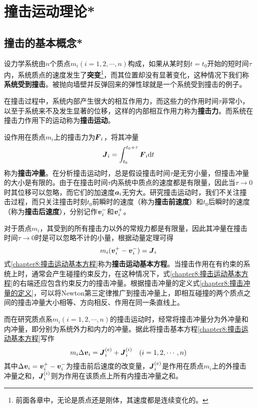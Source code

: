\chapter{撞击运动理论*}

\section{撞击的基本概念*}

设力学系统由$n$个质点$m_i(i=1,2,\cdots,n)$构成，如果从某时刻$t=t_0$开始的短时间$\tau$内，系统质点的速度发生了{\bf 突变}\footnote{前面各章中，无论是质点还是刚体，其速度都是连续变化的。}，而其位置却没有显著变化，这种情况下我们称{\bf 系统受到撞击}。被抛向墙壁并反弹回来的弹性球就是一个系统受到撞击的例子。

在撞击过程中，系统内部产生很大的相互作用力，而这些力的作用时间$\tau$非常小，以至于系统来不及发生显著的位移，这样的内部相互作用力称为{\bf 撞击力}。而系统在撞击力作用下的运动称为{\bf 撞击运动}。

设作用在质点$m_i$上的撞击力为$\boldsymbol{F}_i$，将其冲量
\begin{equation}
	\boldsymbol{J}_i = \int_{t_0}^{t_0+\tau}\boldsymbol{F}_i\mathrm{d} t
	\label{chapter8:撞击冲量的定义}
\end{equation}
称为{\bf 撞击冲量}。在分析撞击运动时，总是假设撞击时间$\tau$是无穷小量，但撞击冲量的大小是有限的。由于在撞击时间$\tau$内系统中质点的速度都是有限量，因此当$\tau\to0$时其位移可以忽略，而它们的加速度$\boldsymbol{a}_i$无穷大。研究撞击运动时，我们不关注撞击过程，而只关注撞击时刻$t_0$前瞬时的速度（称为{\bf 撞击前速度}）和$t_0$后瞬时的速度（称为{\bf 撞击后速度}），分别记作$\boldsymbol{v}_i^-$和$\boldsymbol{v}_i^+$。

对于质点$m_i$，其受到的所有撞击力以外的常规力都是有限量，因此其冲量在撞击时间$\tau\to 0$时是可以忽略不计的小量，根据动量定理可得
\begin{equation}
	m_i(\boldsymbol{v}_i^+-\boldsymbol{v}_i^-) = \boldsymbol{J}_i
	\label{chapter8:撞击运动基本方程}
\end{equation}
式\eqref{chapter8:撞击运动基本方程}称为{\bf 撞击运动基本方程}。当撞击作用在有约束的系统上时，通常会产生碰撞约束反力，在这种情况下，式\eqref{chapter8:撞击运动基本方程}的右端还应包含约束反力的撞击冲量。根据撞击冲量的定义式\eqref{chapter8:撞击冲量的定义}，可以将Newton第三定律推广到撞击冲量上，即相互碰撞的两个质点之间的撞击冲量大小相等、方向相反、作用在同一条直线上。

而在研究质点系$m_i(i=1,2,\cdots,n)$的撞击运动时，经常将撞击冲量分为外冲量和内冲量，即分别为系统外力和内力的冲量。据此将撞击基本方程\eqref{chapter8:撞击运动基本方程}写作
\begin{equation}
	m_i\Delta \boldsymbol{v}_i = \boldsymbol{J}_i^{(e)}+\boldsymbol{J}_i^{(i)}\quad (i=1,2,\cdots,n)
	\label{chapter8:撞击运动基本方程2}
\end{equation}
其中$\Delta \boldsymbol{v}_i = \boldsymbol{v}_i^+-\boldsymbol{v}_i^-$为撞击前后速度的改变量，$\boldsymbol{J}_i^{(e)}$是作用在质点$m_i$上的外撞击冲量之和，$\boldsymbol{J}_i^{(i)}$则为作用在该质点上所有内撞击冲量之和。

